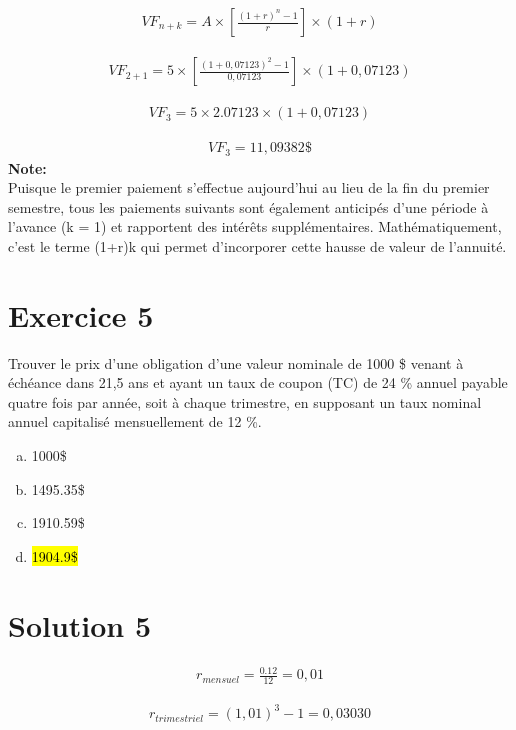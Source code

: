 \documentclass[10pt,a4paper]{article}
\begin{document}
\begin{align*}
VF_{n+k} = A \times \left[ \frac{(1+r)^n-1}{r} \right] \times (1+r)
\end{align*}

\begin{align*}
VF_{2+1} = 5 \times \left[ \frac{(1+0,07123)^2-1}{0,07123} \right] \times (1+0,07123)
\end{align*}

\begin{align*}
VF_{3} = 5 \times 2.07123 \times (1+0,07123)
\end{align*}

\begin{align*}
VF_{3} =  11,09382 \$
\end{align*}
\textbf{Note:} \\ Puisque le premier paiement s'effectue aujourd'hui au lieu de la fin du premier semestre, tous les paiements suivants sont également anticipés d'une période à l'avance (k = 1) et rapportent des intérêts supplémentaires. Mathématiquement, c'est le terme (1+r)k qui permet d'incorporer cette hausse de valeur de l'annuité.

\newpage


\section*{Exercice 5}
Trouver le prix d’une obligation d’une valeur nominale de 1000 \$ venant à échéance dans 21,5 ans et ayant un taux de coupon (TC) de 24 \% annuel payable quatre fois par année, soit à chaque trimestre, en supposant un taux nominal annuel capitalisé mensuellement de 12 \%.

\begin{enumerate}[a)]
\item 1000\$
\item 1495.35\$
\item 1910.59\$
\item \hl{1904.9\$}
\end{enumerate}


\section*{Solution 5}
\begin{align*}
r_{mensuel}  = \frac{0.12}{12} = 0,01
\end{align*}

\begin{align*}
r_{trimestriel} = (1,01)^3-1 = 0,03030
\end{align*}
\end{document}
